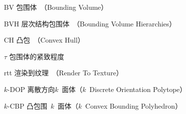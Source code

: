\begin{denotation}

\item[BV] 包围体~（Bounding Volume）
\item[BVH] 层次结构包围体~（Bounding Volume Hierarchies）
\item[CH] 凸包~（Convex Hull）
\item[$\tau$] 包围体的紧致程度 
\item[rtt] 渲染到纹理~（Render To Texture）
\item[$k$-DOP] 离散方向$k$~面体（$k$~Discrete Orientation Polytope）
\item[$k$-CBP] 凸包围~$k$~面体（$k$~Convex Bounding Polyhedron）
\end{denotation}
